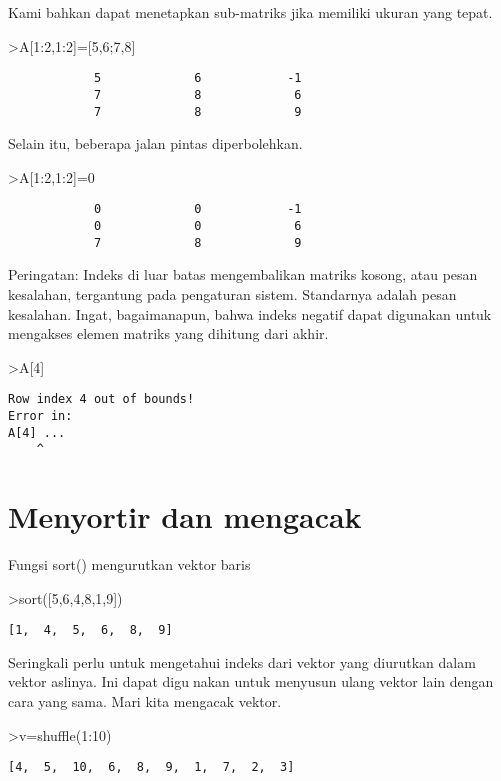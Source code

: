 \documentclass[
]{book}
\begin{document}
Kami bahkan dapat menetapkan sub-matriks jika memiliki ukuran yang tepat.

\textgreater A{[}1:2,1:2{]}={[}5,6;7,8{]}

\begin{verbatim}
            5             6            -1 
            7             8             6 
            7             8             9 
\end{verbatim}

Selain itu, beberapa jalan pintas diperbolehkan.

\textgreater A{[}1:2,1:2{]}=0

\begin{verbatim}
            0             0            -1 
            0             0             6 
            7             8             9 
\end{verbatim}

Peringatan: Indeks di luar batas mengembalikan matriks kosong, atau pesan kesalahan, tergantung pada pengaturan sistem. Standarnya adalah pesan kesalahan. Ingat, bagaimanapun, bahwa indeks negatif dapat digunakan untuk mengakses elemen matriks yang dihitung dari akhir.

\textgreater A{[}4{]}

\begin{verbatim}
Row index 4 out of bounds!
Error in:
A[4] ...
    ^
\end{verbatim}

\chapter{Menyortir dan mengacak}\label{menyortir-dan-mengacak}

Fungsi sort() mengurutkan vektor baris

\textgreater sort({[}5,6,4,8,1,9{]})

\begin{verbatim}
[1,  4,  5,  6,  8,  9]
\end{verbatim}

Seringkali perlu untuk mengetahui indeks dari vektor yang diurutkan dalam vektor aslinya. Ini dapat digunakan untuk menyusun ulang vektor lain dengan cara yang sama. Mari kita mengacak vektor.

\textgreater v=shuffle(1:10)

\begin{verbatim}
[4,  5,  10,  6,  8,  9,  1,  7,  2,  3]
\end{verbatim}
\end{document}
